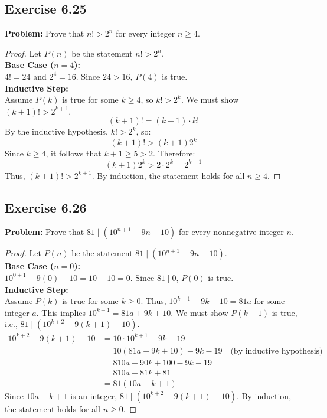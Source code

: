 \documentclass[11pt, a4paper]{article}
\theoremstyle{definition}
\theoremstyle{remark}
\begin{document}
\subsection{Exercise 6.25}
\textbf{Problem:} Prove that $n! > 2^n$ for every integer $n \ge 4$.

\begin{proof}
Let $P(n)$ be the statement $n! > 2^n$.
\vspace{4pt} \\
\textbf{Base Case ($n = 4$):} \\
$4! = 24$ and $2^4 = 16$. Since $24 > 16$, $P(4)$ is true.
\vspace{4pt} \\
\textbf{Inductive Step:} \\
Assume $P(k)$ is true for some $k \ge 4$, so $k! > 2^k$. We must show $(k+1)! > 2^{k+1}$.
\[ (k+1)! = (k+1) \cdot k! \]
By the inductive hypothesis, $k! > 2^k$, so:
\[ (k+1)! > (k+1)2^k \]
Since $k \ge 4$, it follows that $k+1 \ge 5 > 2$. Therefore:
\[ (k+1)2^k > 2 \cdot 2^k = 2^{k+1} \]
Thus, $(k+1)! > 2^{k+1}$. By induction, the statement holds for all $n \ge 4$.
\end{proof}

\subsection{Exercise 6.26}
\textbf{Problem:} Prove that $81 \mid (10^{n+1} - 9n - 10)$ for every nonnegative integer $n$.

\begin{proof}
Let $P(n)$ be the statement $81 \mid (10^{n+1} - 9n - 10)$.
\vspace{4pt} \\
\textbf{Base Case ($n = 0$):} \\
$10^{0+1} - 9(0) - 10 = 10 - 10 = 0$. Since $81 \mid 0$, $P(0)$ is true.
\vspace{4pt} \\
\textbf{Inductive Step:} \\
Assume $P(k)$ is true for some $k \ge 0$. Thus, $10^{k+1} - 9k - 10 = 81a$ for some integer $a$. This implies $10^{k+1} = 81a + 9k + 10$.
We must show $P(k+1)$ is true, i.e., $81 \mid (10^{k+2} - 9(k+1) - 10)$.
\begin{align*}
10^{k+2} - 9(k+1) - 10 &= 10 \cdot 10^{k+1} - 9k - 19 \\
&= 10(81a + 9k + 10) - 9k - 19 \quad \text{(by inductive hypothesis)} \\
&= 810a + 90k + 100 - 9k - 19 \\
&= 810a + 81k + 81 \\
&= 81(10a + k + 1)
\end{align*}
Since $10a + k + 1$ is an integer, $81 \mid (10^{k+2} - 9(k+1) - 10)$. By induction, the statement holds for all $n \ge 0$.
\end{proof}
\end{document}
